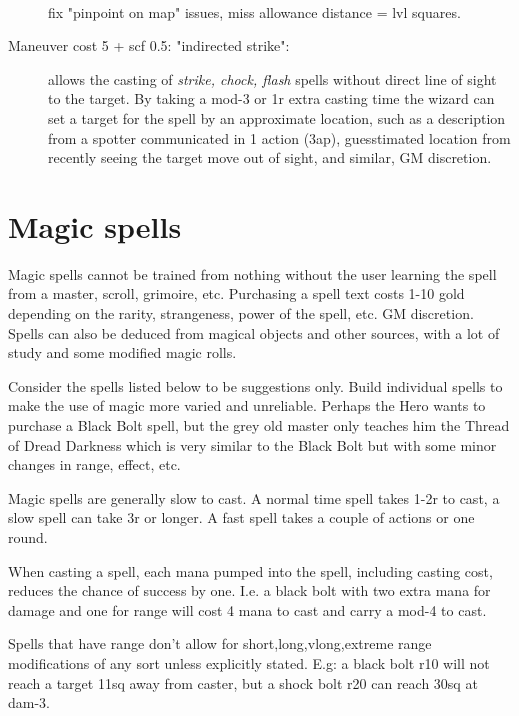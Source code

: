 \begin{description}
\

\todo fix "pinpoint on map" issues, miss allowance distance = lvl squares.

\item[Maneuver cost 5 + scf 0.5: "indirected strike":] allows the casting of \emph{strike, chock, flash} spells without direct line of sight to the target. By taking a mod-3 or 1r extra casting time the wizard can set a target for the spell by an approximate location, such as a description from a spotter communicated in 1 action (3ap), guesstimated location from recently seeing the target move out of sight, and similar, GM discretion.


\end{description}







\section*{Magic spells}

Magic spells cannot be trained from nothing without the user learning the spell from a master, scroll, grimoire, etc. Purchasing a spell text costs 1-10 gold depending on the rarity, strangeness, power of the spell, etc. GM discretion.
Spells can also be deduced from magical objects and other sources, with a lot of study and some modified magic rolls.

Consider the spells listed below to be suggestions only. Build individual spells to make the use of magic more varied and unreliable. Perhaps the Hero wants to purchase a Black Bolt spell, but the grey old master only teaches him the Thread of Dread Darkness which is very similar to the Black Bolt but with some minor changes in range, effect, etc.

Magic spells are generally slow to cast. A normal time spell takes 1-2r to cast, a slow spell can take 3r or longer. A fast spell takes a couple of actions or one round.

When casting a spell, each mana pumped into the spell, including casting cost, reduces the chance of success by one. I.e. a black bolt with two extra mana for damage and one for range will cost 4 mana to cast and carry a mod-4 to cast.

Spells that have range don't allow for short,long,vlong,extreme range modifications of any sort unless explicitly stated. E.g: a black bolt r10 will not reach a target 11sq away from caster, but a shock bolt r20 can reach 30sq at dam-3.


